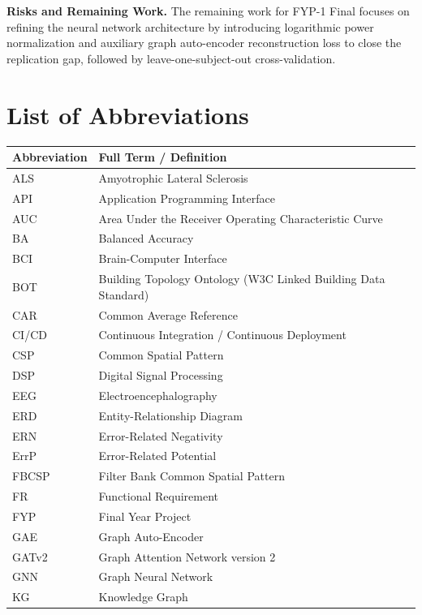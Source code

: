 \documentclass[12pt,a4paper]{report}
\begin{document}
\textbf{Risks and Remaining Work.} The remaining work for FYP-1 Final focuses on refining the neural network architecture by introducing logarithmic power normalization and auxiliary graph auto-encoder reconstruction loss to close the replication gap, followed by leave-one-subject-out cross-validation.

\newpage
\tableofcontents
\listoffigures
\listoftables

\newpage
\chapter*{List of Abbreviations}

\begin{tabularx}{\textwidth}{@{}p{3.0cm} X@{}}
\toprule
\textbf{Abbreviation} & \textbf{Full Term / Definition} \\
\midrule
ALS & Amyotrophic Lateral Sclerosis \\
API & Application Programming Interface \\
AUC & Area Under the Receiver Operating Characteristic Curve \\
BA & Balanced Accuracy \\
BCI & Brain-Computer Interface \\
BOT & Building Topology Ontology (W3C Linked Building Data Standard) \\
CAR & Common Average Reference \\
CI/CD & Continuous Integration / Continuous Deployment \\
CSP & Common Spatial Pattern \\
DSP & Digital Signal Processing \\
EEG & Electroencephalography \\
ERD & Entity-Relationship Diagram \\
ERN & Error-Related Negativity \\
ErrP & Error-Related Potential \\
FBCSP & Filter Bank Common Spatial Pattern \\
FR & Functional Requirement \\
FYP & Final Year Project \\
GAE & Graph Auto-Encoder \\
GATv2 & Graph Attention Network version 2 \\
GNN & Graph Neural Network \\
KG & Knowledge Graph \\

\end{tabularx}
\end{document}
